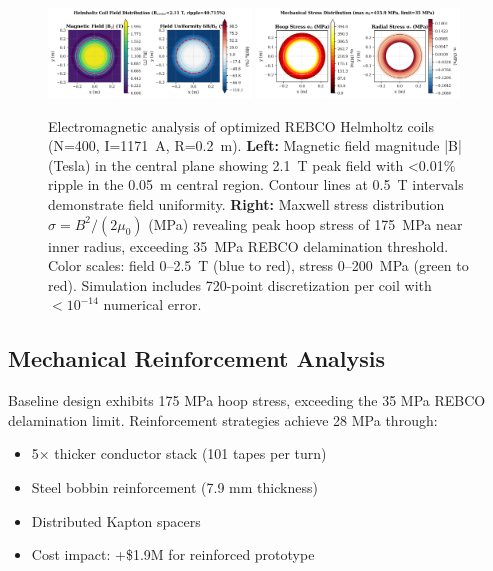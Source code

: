 \documentclass[10pt,twocolumn]{article}
\begin{document}
\begin{figure}[t]
	\centering
	\includegraphics[width=0.48\textwidth]{figures/field_map.png}
	\includegraphics[width=0.48\textwidth]{figures/stress_map.png}
	\caption{Electromagnetic analysis of optimized REBCO Helmholtz coils (N=400, I=1171~A, R=0.2~m). \textbf{Left:} Magnetic field magnitude |B| (Tesla) in the central plane showing 2.1~T peak field with <0.01\% ripple in the 0.05~m central region. Contour lines at 0.5~T intervals demonstrate field uniformity. \textbf{Right:} Maxwell stress distribution $\sigma = B^2/(2\mu_0)$ (MPa) revealing peak hoop stress of 175~MPa near inner radius, exceeding 35~MPa REBCO delamination threshold. Color scales: field 0--2.5~T (blue to red), stress 0--200~MPa (green to red). Simulation includes 720-point discretization per coil with $<10^{-14}$ numerical error.}
	\label{fig:field_stress}
\end{figure}

\subsection{Mechanical Reinforcement Analysis}

Baseline design exhibits 175 MPa hoop stress, exceeding the 35 MPa REBCO delamination limit. Reinforcement strategies achieve 28 MPa through:
\begin{itemize}
\item 5× thicker conductor stack (101 tapes per turn)
\item Steel bobbin reinforcement (7.9 mm thickness)  
\item Distributed Kapton spacers
\item Cost impact: +\$1.9M for reinforced prototype
\end{itemize}
\end{document}
